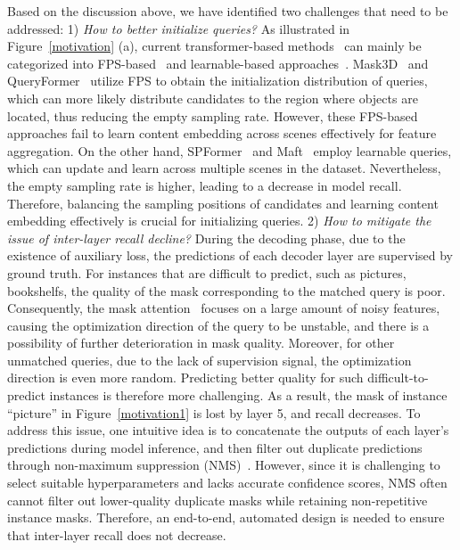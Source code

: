 Based on the discussion above, we have identified two challenges that need to be addressed:
1) \textit{How to better initialize queries?}
As illustrated in Figure~\ref{motivation} (a), current transformer-based methods~\cite{schult2022mask3d,sun2023superpoint,lu2023query,lai2023mask} can mainly be categorized into FPS-based~\cite{schult2022mask3d,lu2023query} and learnable-based approaches~\cite{sun2023superpoint,lai2023mask}. Mask3D~\cite{schult2022mask3d} and QueryFormer~\cite{lu2023query} utilize FPS to obtain the initialization distribution of queries, which can more likely distribute candidates to the region where objects are located, thus reducing the empty sampling rate. However, these FPS-based approaches fail to learn content embedding across scenes effectively for feature aggregation. On the other hand, SPFormer~\cite{sun2023superpoint} and Maft~\cite{lai2023mask} employ learnable queries, which can update and learn across multiple scenes in the dataset. Nevertheless, the empty sampling rate is higher, leading to a decrease in model recall. Therefore, balancing the sampling positions of candidates and learning content embedding effectively is crucial for initializing queries.
2) \textit{How to mitigate the issue of inter-layer recall decline?}
During the decoding phase, due to the existence of auxiliary loss, the predictions of each decoder layer are supervised by ground truth. For instances that are difficult to predict, such as pictures, bookshelfs, the quality of the mask corresponding to the matched query is poor. Consequently, the mask attention~\cite{schult2022mask3d,sun2023superpoint} focuses on a large amount of noisy features, causing the optimization direction of the query to be unstable, and there is a possibility of further deterioration in mask quality. Moreover, for other unmatched queries, due to the lack of supervision signal, the optimization direction is even more random. Predicting better quality for such difficult-to-predict instances is therefore more challenging. As a result, the mask of instance ``picture'' in Figure~\ref{motivation1} is lost by layer 5, and recall decreases. To address this issue, one intuitive idea is to concatenate the outputs of each layer's predictions during model inference, and then filter out duplicate predictions through non-maximum suppression (NMS)~\cite{neubeck2006efficient}. However, since it is challenging to select suitable hyperparameters and lacks accurate confidence scores, NMS often cannot filter out lower-quality duplicate masks while retaining non-repetitive instance masks. Therefore, an end-to-end, automated design is needed to ensure that inter-layer recall does not decrease.



